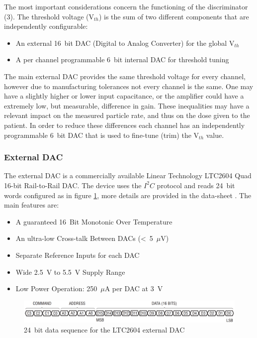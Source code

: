 \noindent The most important considerations concern the functioning of the discriminator (3).
The threshold voltage (V$_{th}$) is the sum of two different components that are independently configurable:
\begin{itemize}
	\item An external 16~bit DAC (Digital to Analog Converter) for the global V$_{th}$ 
	\item A per channel programmable 6~bit internal DAC for threshold tuning
\end{itemize}
\noindent The main external DAC provides the same threshold voltage for every channel, however due to manufacturing tolerances not every channel is the same. One may have a slightly higher or lower input capacitance, or the amplifier could have a extremely low, but measurable, difference in gain.    
These inequalities may have a relevant impact on the measured particle rate, and thus on the dose given to the patient.
In order to reduce these differences each channel has an independently programmable 6~bit DAC that is used to fine-tune (trim) the V$_{th}$ value.    
\subsubsection{External DAC}
The external DAC is a commercially available Linear Technology LTC2604 Quad 16-bit Rail-to-Rail DAC.
The device uses the $I^2C$ protocol and reads 24~bit words configured as in figure \ref{fig:extdactiming2}, more details are provided in the data-sheet \cite{LTC2604}.
The main features are:
\begin{itemize}
	\item A guaranteed 16~Bit Monotonic Over Temperature
	\item An ultra-low Cross-talk Between DACs (<~5~$\mu$V)
	\item Separate Reference Inputs for each DAC
	\item Wide 2.5~V to 5.5~V Supply Range
	\item Low Power Operation: 250~$\mu$A per DAC at 3~V
\end{itemize} 
\begin{figure}[H]
	\centering
	\includegraphics[width=0.99\linewidth]{IMG/ch2/EXTDACTIMING2}
	\caption{24~bit data sequence for the LTC2604 external DAC}
	\label{fig:extdactiming2}
\end{figure}
